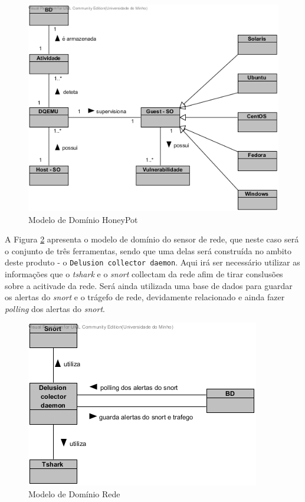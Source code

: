 \begin{figure}[!ht]
\centering	
\includegraphics[scale=0.8]{images/ModelosDeDominio/HoneyPot.png}
\caption{Modelo de Domínio HoneyPot}
\label{fig:mdhoney}
\end{figure}
\pagebreak

A Figura \ref{fig:mdrede} apresenta o modelo de domínio do sensor de rede, que neste caso será o conjunto de três ferramentas, sendo que uma delas será
construída no ambito deste produto - o \texttt{Delusion collector daemon}. Aqui irá ser necessário utilizar as informações que o \emph{tshark} e o \emph{snort} collectam da rede
afim de tirar conslusões sobre a acitivade da rede. Será ainda utilizada uma base de dados para guardar os alertas do \emph{snort} e o trágefo de rede, devidamente relacionado
e ainda fazer \emph{polling} dos alertas do \emph{snort}.

\begin{figure}[!ht]
\centering	
\includegraphics[scale=0.8]{images/ModelosDeDominio/Rede.png}
\caption{Modelo de Domínio Rede}
\label{fig:mdrede}
\end{figure}
\pagebreak

